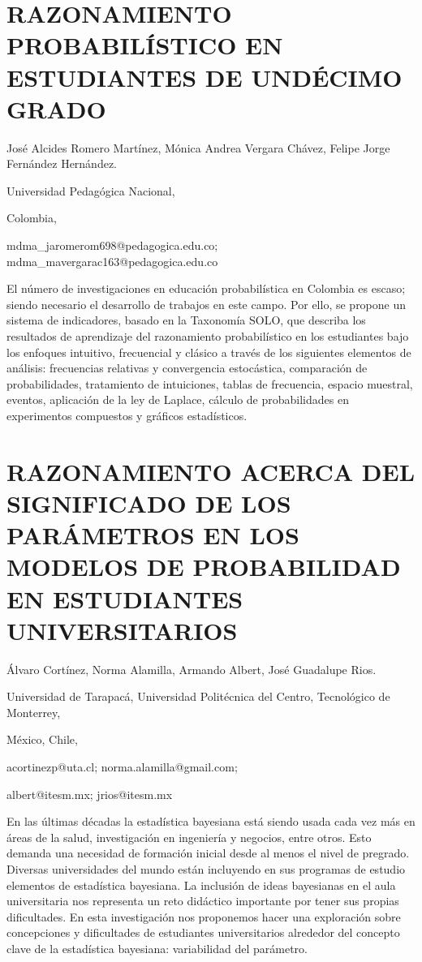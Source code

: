 \section{RAZONAMIENTO PROBABILÍSTICO EN ESTUDIANTES DE UNDÉCIMO GRADO}

\begin{datos}

José Alcides Romero Martínez, Mónica Andrea Vergara Chávez, Felipe
Jorge Fernández Hernández.

Universidad Pedagógica Nacional,

Colombia,

mdma\_jaromerom698@pedagogica.edu.co; mdma\_mavergarac163@pedagogica.edu.co

\end{datos}

El número de investigaciones en educación probabilística en Colombia
es escaso; siendo necesario el desarrollo de trabajos en este campo.
Por ello, se propone un sistema de indicadores, basado en la Taxonomía
SOLO, que describa los resultados de aprendizaje del razonamiento
probabilístico en los estudiantes bajo los enfoques intuitivo, frecuencial
y clásico a través de los siguientes elementos de análisis: frecuencias
relativas y convergencia estocástica, comparación de probabilidades,
tratamiento de intuiciones, tablas de frecuencia, espacio muestral,
eventos, aplicación de la ley de Laplace, cálculo de probabilidades
en experimentos compuestos y gráficos estadísticos.


\section{RAZONAMIENTO ACERCA DEL SIGNIFICADO DE LOS PARÁMETROS EN LOS MODELOS
DE PROBABILIDAD EN ESTUDIANTES UNIVERSITARIOS}

\begin{datos}

Álvaro Cortínez, Norma Alamilla, Armando Albert, José Guadalupe Rios.

Universidad de Tarapacá, Universidad Politécnica del Centro, Tecnológico
de Monterrey,

México, Chile, 

acortinezp@uta.cl; norma.alamilla@gmail.com;

albert@itesm.mx; jrios@itesm.mx

\end{datos}

En las últimas décadas la estadística bayesiana está siendo usada
cada vez más en áreas de la salud, investigación en ingeniería y negocios,
entre otros. Esto demanda una necesidad de formación inicial desde
al menos el nivel de pregrado. Diversas universidades del mundo están
incluyendo en sus programas de estudio elementos de estadística bayesiana.
La inclusión de ideas bayesianas en el aula universitaria nos representa
un reto didáctico importante por tener sus propias dificultades. En
esta investigación nos proponemos hacer una exploración sobre concepciones
y dificultades de estudiantes universitarios alrededor del concepto
clave de la estadística bayesiana: variabilidad del parámetro.



